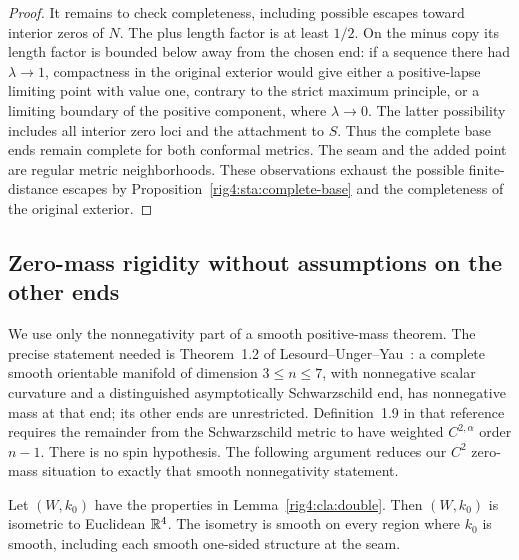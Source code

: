 \begin{proof}
It remains to check completeness, including possible escapes toward
interior zeros of $N$.  The plus length factor is at least $1/2$.
On the minus copy its length factor is bounded below away from the
chosen end: if a sequence there had $\lambda\to1$, compactness in
the original exterior would give either a positive-lapse limiting
point with value one, contrary to the strict maximum principle, or
a limiting boundary of the positive component, where $\lambda\to0$.
The latter possibility includes all interior zero loci and the
attachment to $S$.  Thus the complete base ends remain complete for
both conformal metrics.  The seam and the added point are regular
metric neighborhoods.  These observations exhaust the possible
finite-distance escapes by Proposition~\ref{rig4:sta:complete-base} and
the completeness of the original exterior.
\end{proof}

\subsection{Zero-mass rigidity without assumptions on the other ends}

We use only the nonnegativity part of a smooth positive-mass theorem.
The precise statement needed is
Theorem~1.2 of Lesourd--Unger--Yau~\cite{LesourdUngerYau2021}:
a complete smooth orientable manifold of dimension $3\le n\le7$,
with nonnegative scalar curvature and a distinguished asymptotically
Schwarzschild end, has nonnegative mass at that end; its other ends
are unrestricted.  Definition~1.9 in that reference requires the
remainder from the Schwarzschild metric to have weighted
$C^{2,\alpha}$ order $n-1$.  There is no spin hypothesis.
The following argument reduces our $C^2$ zero-mass situation to
exactly that smooth nonnegativity statement.

\begin{lemma}
\label{rig4:cla:zero-mass}
Let $(W,k_0)$ have the properties in Lemma~\ref{rig4:cla:double}.
Then $(W,k_0)$ is isometric to Euclidean $\mathbb R^4$.
The isometry is smooth on every region where $k_0$ is smooth,
including each smooth one-sided structure at the seam.
\end{lemma}

